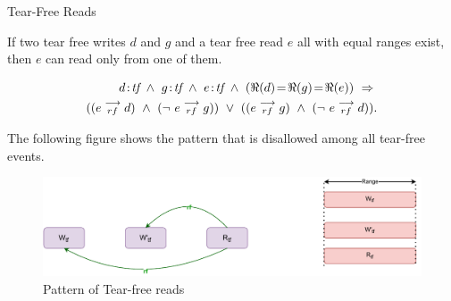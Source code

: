 
        \begin{axiom}{Tear-Free Reads} 
            \label{TfRe}

            If two tear free writes $d$ and $g$ and a tear free read $e$ all with equal ranges exist, then $e$ can read only from one of them\footnotemark.
                
            \begin{align*}
                \et{d}{tf}\ \wedge\ \et{g}{tf} \ \wedge \ \et{e}{tf} 
                  \ \wedge \ 
                  (\Re(d) \!=\! \Re(g) \!=\! \Re(e)) 
                  \ \Rightarrow{} \\ 
                      ((\reln{e}{rf}{d}) 
                      \ \wedge \ 
                      (\neg \ \reln{e}{rf}{g})) 
                  \ \vee \  
                      ((\reln{e}{rf}{g}) 
                      \ \wedge \
                      (\neg \ \reln{e}{rf}{d})).
            \end{align*}
                    
            The following figure shows the pattern that is disallowed among all tear-free events. 
            \begin{figure}[H]
                \centering
                \includegraphics[scale=0.7]{ECMAScriptMemoryModel/TearFreeReads.pdf}
                \caption{Pattern of Tear-free reads}
            \end{figure}

        \end{axiom}

